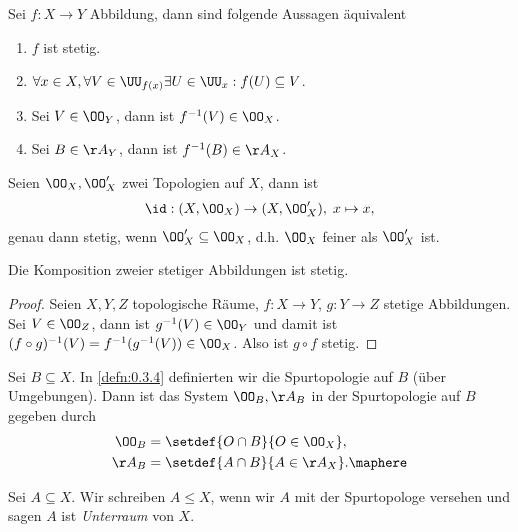 \begin{lem}
\label{prop:1.2.1}
Sei $f: X\to Y$ Abbildung, dann sind folgende Aussagen äquivalent
\begin{enumerate}
  \item $f$ ist stetig.
  \item $\forall x\in X, \forall V\in \UU_{f(x)} \exists U\in \UU_x : f(U) 
  \subseteq V$.
  \item Sei $V\in \OO_Y$, dann ist $f^{-1}(V)\in\OO_X$.
  \item Sei $B\in \AA_Y$, dann ist $f^{-1}(B)\in \AA_X$.\fishhere
\end{enumerate}
\end{lem}

\begin{bem}
\label{bem:1.2.2}
Seien $\OO_X,\OO_X'$ zwei Topologien auf $X$, dann ist
\begin{align*}
\id: (X,\OO_X) \to
(X,\OO_X'),\;x\mapsto x,
\end{align*}
genau dann stetig, wenn $\OO_X'\subseteq \OO_X$, d.h.
$\OO_X$ feiner als $\OO_X'$ ist.\maphere
\end{bem}

\begin{lem}
\label{prop:1.2.3}
Die Komposition zweier stetiger Abbildungen ist stetig.\fishhere
\end{lem}
\begin{proof}
Seien $X,Y,Z$ topologische Räume, $f:X\to Y$, $g: Y\to Z$ stetige Abbildungen.
Sei $V\in\OO_Z$, dann ist $g^{-1}(V) \in \OO_Y$ und damit ist
$(f\circ g)^{-1}(V) = f^{-1}(g^{-1}(V)) \in \OO_X$. Also ist $g\circ f$
stetig.\qedhere
\end{proof}

\begin{bemn}
Sei $B\subseteq X$. In \ref{defn:0.3.4} definierten wir die Spurtopologie auf
$B$ (über Umgebungen). Dann ist das System $\OO_B, \AA_B$ in der Spurtopologie
auf $B$ gegeben durch
\begin{align*}
\OO_B &= \setdef{O\cap B}{O\in\OO_X},\\
\AA_B &= \setdef{A\cap B}{A\in\AA_X}.\maphere
\end{align*}
\end{bemn}

\begin{defn}[Bezeichnung]
\label{defn:1.2.4}
Sei $A\subseteq X$. Wir schreiben $A\le X$, wenn wir $A$ mit der Spurtopologe
versehen und sagen $A$ ist \emph{Unterraum} von $X$.\fishhere
\end{defn}

